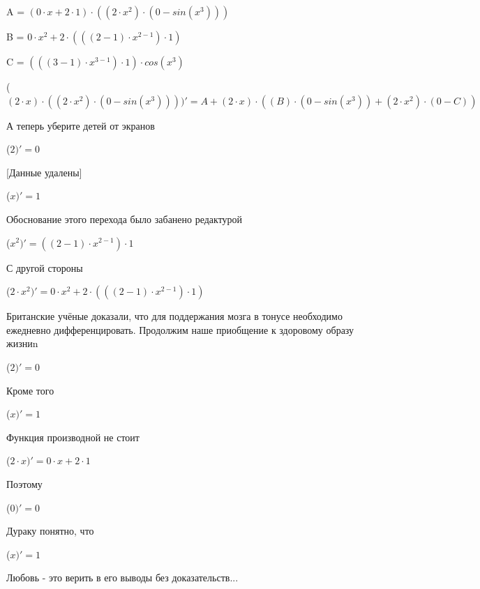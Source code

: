 \documentclass[12pt,a4paper,fleqn]{article}
\begin{document}
\begin{center}
A = $(0 \cdot x+2 \cdot 1) \cdot ((2 \cdot x^{2}) \cdot (0-sin(x^{3})))$\end{center}
\begin{center}
B = $0 \cdot x^{2}+2 \cdot (((2-1) \cdot x^{2-1}) \cdot 1)$\end{center}
\begin{center}
C = $(((3-1) \cdot x^{3-1}) \cdot 1) \cdot cos(x^{3})$\end{center}
\begin{center}
 ($(2 \cdot x) \cdot ((2 \cdot x^{2}) \cdot (0-sin(x^{3}))))'
  = A+(2 \cdot x) \cdot ((B) \cdot (0-sin(x^{3}))+(2 \cdot x^{2}) \cdot (0-C))$\end{center}
А теперь уберите детей от экранов

\begin{center}
 ($2)'
  = 0$\end{center}
[Данные удалены]

\begin{center}
 ($x)'
  = 1$\end{center}
Обоснование этого перехода было забанено редактурой

\begin{center}
 ($x^{2})'
  = ((2-1) \cdot x^{2-1}) \cdot 1$\end{center}
С другой стороны

\begin{center}
 ($2 \cdot x^{2})'
  = 0 \cdot x^{2}+2 \cdot (((2-1) \cdot x^{2-1}) \cdot 1)$\end{center}
Британские учёные доказали, что для поддержания мозга в тонусе необходимо ежедневно дифференцировать. Продолжим наше приобщение к здоровому образу жизниn

\begin{center}
 ($2)'
  = 0$\end{center}
Кроме того

\begin{center}
 ($x)'
  = 1$\end{center}
Функция производной не стоит\cite{link2}

\begin{center}
 ($2 \cdot x)'
  = 0 \cdot x+2 \cdot 1$\end{center}
Поэтому

\begin{center}
 ($0)'
  = 0$\end{center}
Дураку понятно, что

\begin{center}
 ($x)'
  = 1$\end{center}
Любовь - это верить в его выводы без доказательств...
\end{document}
